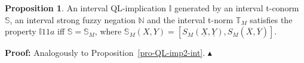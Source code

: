 \documentclass[12pt]{article}
\theoremstyle{plain}
\theoremstyle{remark}
\theoremstyle{definition}
\theoremstyle{proposition}
\newtheorem{proposition}[theorem]{Proposition}
\newcommand{\II}{\mathbb{I} }
\newcommand{\NN}{\mathbb{N} }
\newcommand{\TT}{\mathbb{T} }
\newcommand{\Ss}{\mathbb{S} }
\newcommand{\prova}[1]{\noindent\textbf{Proof:} #1\hfill
{\small $\blacktriangle$}\\}
\begin{document}




\begin{proposition}\label{pro-QL-imp3-int}
An interval QL-implication $\II$ generated by an interval t-conorm
$\Ss$, an interval strong fuzzy negation $\NN$ and the interval
t-norm $\TT_M$ satisfies the property $\II 11a$ iff $\Ss=\Ss_M$,
where $\Ss_M(X,Y)= [S_M(\underline{X}, \underline{Y}),
S_M(\overline{X}, \overline{Y})]$.
\end{proposition}
\prova{Analogously to Proposition~\ref{pro-QL-imp2-int}.}


\end{document}

